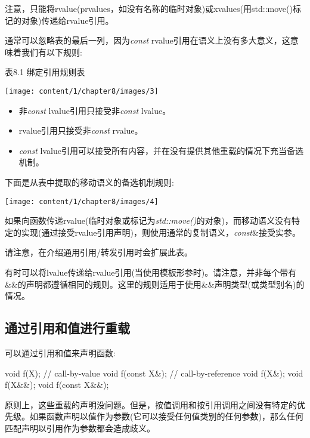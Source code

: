注意，只能将rvalue(prvalues，如没有名称的临时对象)或xvalues(用std::move()标记的对象)传递给rvalue引用。

通常可以忽略表的最后一列，因为\textit{const} rvalue引用在语义上没有多大意义，这意味着我们有以下规则:

\hspace*{\fill}  %
表8.1 绑定引用规则表

\begin{center}
	\texttt{[image: content/1/chapter8/images/3]}
\end{center}

\begin{itemize}
	\item 非\textit{const} lvalue引用只接受非\textit{const} lvalue。 
	\item rvalue引用只接受非\textit{const} rvalue。
	\item \textit{const} lvalue引用可以接受所有内容，并在没有提供其他重载的情况下充当备选机制。
\end{itemize}

下面是从表中提取的移动语义的备选机制规则:

\begin{center}
	\texttt{[image: content/1/chapter8/images/4]}
\end{center}

如果向函数传递rvalue(临时对象或标记为\textit{std::move()}的对象)，而移动语义没有特定的实现(通过接受rvalue引用声明)，则使用通常的复制语义，\textit{const}\&接受实参。

请注意，在介绍通用引用/转发引用时会扩展此表。

有时可以将lvalue传递给rvalue引用(当使用模板形参时)。请注意，并非每个带有\&\&的声明都遵循相同的规则。这里的规则适用于使用\&\&声明类型(或类型别名)的情况。

\subsection{通过引用和值进行重载}

可以通过引用和值来声明函数:

\begin{cppcode}
void f(X); // call-by-value
void f(const X&); // call-by-reference
void f(X&);
void f(X&&);
void f(const X&&);
\end{cppcode}

原则上，这些重载的声明没问题。但是，按值调用和按引用调用之间没有特定的优先级。如果函数声明以值作为参数(它可以接受任何值类别的任何参数)，那么任何匹配声明以引用作为参数都会造成歧义。

